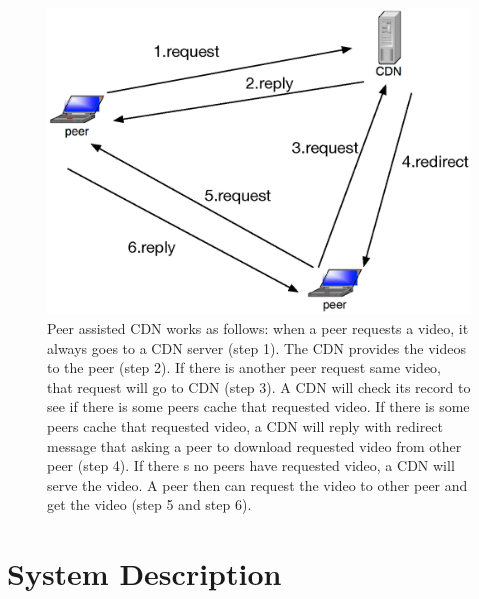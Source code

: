 \documentclass[10pt,final,journal,a4paper]{IEEEtran}
\begin{document}

\begin{figure}[!t]
\begin{center}
\includegraphics[scale=0.4]{graphs/p2p-system-description.eps}
\end{center}
\caption{Peer assisted CDN works as follows:
when a peer requests a video, it always goes to a CDN server (step 1). 
The CDN provides the videos to the peer (step 2). 
If there is another peer request same video, that request will go to CDN (step 3).  
A CDN will check its record to see if there is some peers cache that requested video.  
If there is some peers cache that requested video, a CDN will reply with redirect message that asking a peer to download requested video from other peer (step 4).
If there s no peers have requested video, a CDN will serve the video.   
A peer then can request the video to other peer and get the video (step 5 and step 6).
}
\label{fig:p2pcdninteractioninsimulator}
\end{figure} 



\section{System Description}\label{systemdescription}
\end{document}
